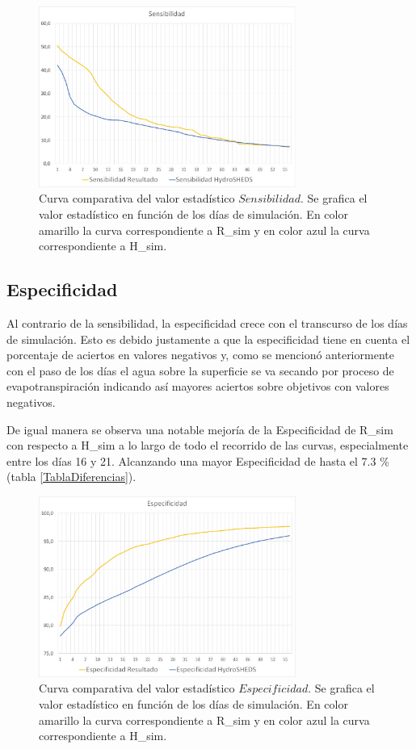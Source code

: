 \documentclass[10pt,a4paper, twoside]{report}
\begin{document}
\begin{figure}[H]
   \centering      
   \includegraphics[width=0.75\textwidth]{imagenes/Sensibilidad.jpg}
 \caption{Curva comparativa del valor estadístico $Sensibilidad$. Se grafica el valor estadístico en función de los días de simulación. En color amarillo la curva correspondiente a R\_sim y en color azul la curva correspondiente a H\_sim.}
 \label{Sensibilidad}
\end{figure}

\subsection{Especificidad}

Al contrario de la sensibilidad, la especificidad crece con el transcurso de los días de simulación. Esto es debido justamente a que la especificidad tiene en cuenta el porcentaje de aciertos en valores negativos y, como se mencionó anteriormente con el paso de los días el agua sobre la superficie se va secando por proceso de evapotranspiración indicando así mayores aciertos sobre objetivos con valores negativos.

De igual manera se observa una notable mejoría de la Especificidad de R\_sim con respecto a H\_sim a lo largo de todo el recorrido de las curvas, especialmente entre los días 16 y 21. Alcanzando una mayor Especificidad de hasta el 7.3 \% (tabla \ref{TablaDiferencias}).

\begin{figure}[H]
   \centering      
   \includegraphics[width=0.75\textwidth]{imagenes/Especificidad.jpg}
 \caption{Curva comparativa del valor estadístico $Especificidad$. Se grafica el valor estadístico en función de los días de simulación. En color amarillo la curva correspondiente a R\_sim y en color azul la curva correspondiente a H\_sim.}
 \label{Especificidad}
\end{figure}
\end{document}
